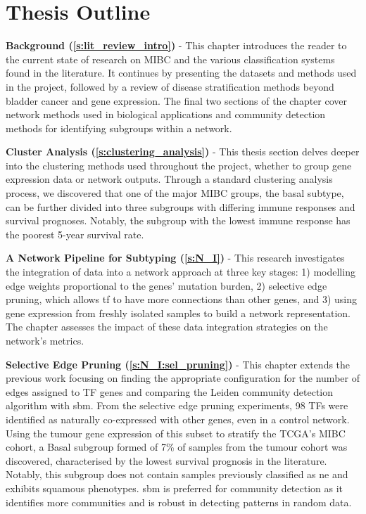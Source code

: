 \section{Thesis Outline}

\textbf{Background (\cref{s:lit_review_intro})} - This chapter introduces the reader to the current state of research on MIBC and the various classification systems found in the literature. It continues by presenting the datasets and methods used in the project, followed by a review of disease stratification methods beyond bladder cancer and gene expression. The final two sections of the chapter cover network methods used in biological applications and community detection methods for identifying subgroups within a network.


\textbf{Cluster Analysis (\cref{s:clustering_analysis})} - This thesis section delves deeper into the clustering methods used throughout the project, whether to group gene expression data or network outputs. Through a standard clustering analysis process, we discovered that one of the major MIBC groups, the basal subtype, can be further divided into three subgroups with differing immune responses and survival prognoses. Notably, the subgroup with the lowest immune response has the poorest 5-year survival rate.

\textbf{A Network Pipeline for Subtyping (\cref{s:N_I})} - This research investigates the integration of data into a network approach at three key stages: 1) modelling edge weights proportional to the genes' mutation burden, 2) selective edge pruning, which allows \acrlong{tf} to have more connections than other genes, and 3) using gene expression from freshly isolated samples to build a network representation. The chapter assesses the impact of these data integration strategies on the network's metrics.


\textbf{Selective Edge Pruning (\cref{s:N_I:sel_pruning})} - This chapter extends the previous work focusing on finding the appropriate configuration for the number of edges assigned to TF genes and comparing the Leiden community detection algorithm with \acrfull{sbm}. From the selective edge pruning experiments, 98 TFs were identified as naturally co-expressed with other genes, even in a control network. Using the tumour gene expression of this subset to stratify the TCGA's MIBC cohort, a Basal subgroup formed of 7\% of samples from the tumour cohort was discovered, characterised by the lowest survival prognosis in the literature. Notably, this subgroup does not contain samples previously classified as \acrlong{ne} and exhibits squamous phenotypes. \acrshort{sbm} is preferred for community detection as it identifies more communities and is robust in detecting patterns in random data.


